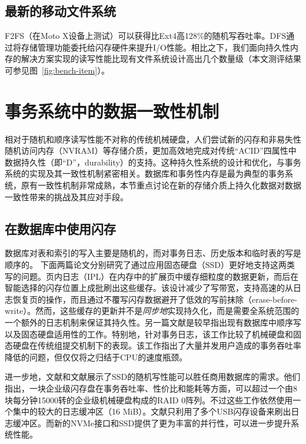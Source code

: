 \subsection{最新的移动文件系统}
F2FS\cite{188454}（在Moto X设备上测试）可以获得比Ext4\cite{MOTOX:2013}高128\%的随机写吞吐率。DFS\cite{Josephson:2010:DFS:1855511.1855518}通过将存储管理功能委托给闪存硬件来提升I/O性能。相比之下，我们面向持久性内存的解决方案实现的读写性能比现有文件系统设计高出几个数量级（本文测评结果可参见图~\ref{fig:bench-item}）。

\section{事务系统中的数据一致性机制}

相对于随机和顺序读写性能不对称的传统机械硬盘，人们尝试新的闪存和非易失性随机访问内存（NVRAM）等存储介质，更加高效地完成对传统“ACID”四属性中数据持久性（即“D”，durability）的支持。这种持久性系统的设计和优化，与事务系统的实现及其一致性机制紧密相关。数据库和事务性内存是最为典型的事务系统，原有一致性机制非常成熟，本节重点讨论在新的存储介质上持久化数据对数据一致性带来的挑战及其应对手段。

\subsection{在数据库中使用闪存}

数据库对表和索引的写入主要是随机的，而对事务日志、历史版本和临时表的写是顺序的。
下面两篇论文分别研究了通过应用固态硬盘（SSD）更好地支持这两类写的问题。页内日志（IPL）\cite{Lee:2007:DFD:1247480.1247488}在内存中的扩展页中缓存细粒度的数据更新，而后在智能选择的闪存位置上成批刷出这些缓存。该设计减少了写带宽，支持高速的从日志恢复页的操作，而且通过不覆写闪存数据避开了低效的写前抹除（erase-before-write）。然而，这些缓存的更新并不是\emph{同步地}实现持久化，而是需要全系统范围的一个额外的日志机制来保证其持久性。另一篇文献\cite{Lee:2008:CFM:1376616.1376723}是较早指出现有数据库中顺序写以及固态硬盘适用性的工作。特别地，针对事务日志，该工作比较了机械硬盘和固态硬盘在传统组提交机制下的表现。该工作指出了大量并发用户造成的事务吞吐率降低的问题，但仅仅将之归结于CPU的速度瓶颈。

进一步地，文献\cite{Lee:2009:AFM:1559845.1559937}和文献\cite{Chen:2009:FEF:1559845.1559855}展示了SSD的随机写性能可以胜任商用数据库的需求。他们指出，一块企业级闪存盘在事务吞吐率、性价比和能耗等方面，可以超过一个由8块每分钟15000转的企业级机械硬盘构成的RAID 0阵列。不过这些工作依然使用一个集中的较大的日志缓冲区（16 MiB）。文献\cite{Chen:2009:FEF:1559845.1559855}只利用了多个USB闪存设备来刷出日志缓冲区。而新的NVMe接口和SSD提供了更为丰富的并行性，可以进一步提升系统性能。

